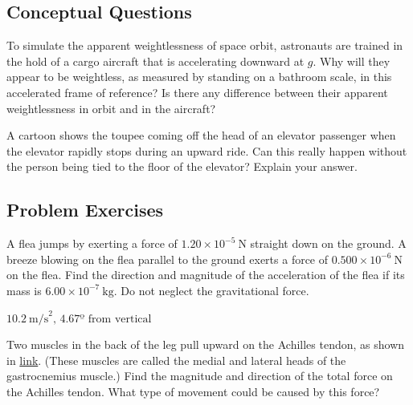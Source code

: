 \documentclass[
]{book}
\begin{document}
\hypertarget{fs-id1549126}{}
\hypertarget{conceptual-questions-16}{%
\subsection{Conceptual Questions}\label{conceptual-questions-16}}

\hypertarget{fs-id3109644}{}
\leavevmode{}%
To simulate the apparent weightlessness of space orbit, astronauts are
trained in the hold of a cargo aircraft that is accelerating downward at
\(g{}\). Why will they appear to be weightless, as measured by standing on
a bathroom scale, in this accelerated frame of reference? Is there any
difference between their apparent weightlessness in orbit and in the
aircraft?

\hypertarget{fs-id1449853}{}
\leavevmode{}%
A cartoon shows the toupee coming off the head of an elevator passenger
when the elevator rapidly stops during an upward ride. Can this really
happen without the person being tied to the floor of the elevator?
Explain your answer.

\hypertarget{fs-id2678901}{}
\hypertarget{problem-exercises-4}{%
\subsection{Problem Exercises}\label{problem-exercises-4}}

\hypertarget{fs-id2391286}{}
\leavevmode{}%
A flea jumps by exerting a force of
\({1\text{.}{\text{20} \times \text{10}^{- 5}}\ \text{N}}{}\) straight
down on the ground. A breeze blowing on the flea parallel to the ground
exerts a force of
\({0\text{.}{\text{500} \times \text{10}^{- 6}}\ \text{N}}{}\) on the
flea. Find the direction and magnitude of the acceleration of the flea
if its mass is
\({6\text{.}{\text{00} \times \text{10}^{- 7}}\ \text{kg}}{}\). Do not
neglect the gravitational force.

\leavevmode{}%
\(\text{10.2}\ \text{m/s}^{2}\text{,\ 4.67º\ from\ vertical}\)

\hypertarget{fs-id1427030}{}
\leavevmode{}%
Two muscles in the back of the leg pull upward on the Achilles tendon,
as shown in \protect\hyperlink{import-auto-id2667995}{link}.
(These muscles are called the medial and lateral heads of the
gastrocnemius muscle.) Find the magnitude and direction of the total
force on the Achilles tendon. What type of movement could be caused by
this force?
\end{document}
